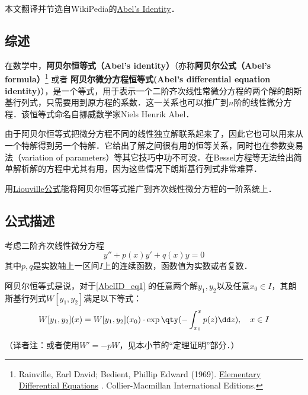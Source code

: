 
本文翻译并节选自WikiPedia的\href{https://en.wikipedia.org/wiki/Abel\%27s_identity}{Abel's Identity}．


\subsection{综述}

在数学中，\textbf{阿贝尔恒等式（Abel's identity）}（亦称\textbf{阿贝尔公式（Abel's formula）}\footnote{ Rainville, Earl David; Bedient, Phillip Edward (1969). \href{https://archive.org/details/elementarydiffer00rain}{ Elementary Differential Equations} . Collier-Macmillan International Editions.} 或者 \textbf{阿贝尔微分方程恒等式(Abel's differential equation identity)}），是一个等式，用于表示一个二阶齐次线性常微分方程的两个解的朗斯基行列式，只需要用到原方程的系数．这一关系也可以推广到$n$阶的线性微分方程．该恒等式命名自挪威数学家Niels Henrik Abel．

由于阿贝尔恒等式把微分方程不同的线性独立解联系起来了，因此它也可以用来从一个特解得到另一个特解．它给出了解之间很有用的恒等关系，同时也在参数变易法（variation of parameters）等其它技巧中功不可没．在Bessel方程等无法给出简单解析解的方程中尤其有用，因为这些情况下朗斯基行列式非常难算．

用\href{https://en.wikipedia.org/wiki/Liouville\%27s_formula}{Liouville公式}能将阿贝尔恒等式推广到齐次线性微分方程的一阶系统上．



\subsection{公式描述}

考虑二阶齐次线性微分方程
\begin{equation}\label{AbelID_eq1}
y'' + p(x)y' +q(x)y = 0
\end{equation}
其中$p, q$是实数轴上一区间$I$上的连续函数，函数值为实数或者复数．

阿贝尔恒等式是说，对于\autoref{AbelID_eq1} 的任意两个解$y_1, y_2$以及任意$x_0\in I$，其朗斯基行列式$W[y_1, y_2]$满足以下等式：
\begin{equation}\label{AbelID_eq4}
W[y_1, y_2](x) = W[y_1, y_2](x_0)\cdot \exp\qty(-\int _{x_0}^x p(z)\dd z), \quad x\in I
\end{equation}

（译者注：或者使用$W'=-pW$，见本小节的“定理证明”部分．）


